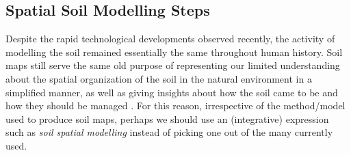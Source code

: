 

\subsection{Spatial Soil Modelling Steps}

Despite the rapid technological developments observed recently, the activity of modelling the soil remained 
essentially the same throughout human history. Soil maps still serve the same old purpose of representing our 
limited understanding about the spatial organization of the soil in the natural environment in a simplified 
manner, as well as giving insights about how the soil came to be and how they should be managed 
\cite{Jenny1941, Hudson1992, Legros2006, Blanco-CanquiEtAl2010, Grunwald2010}. For this reason, irrespective 
of the method/model used to produce soil maps, perhaps we should use an (integrative) expression such as 
\emph{soil spatial modelling} instead of picking one out of the many currently used.

